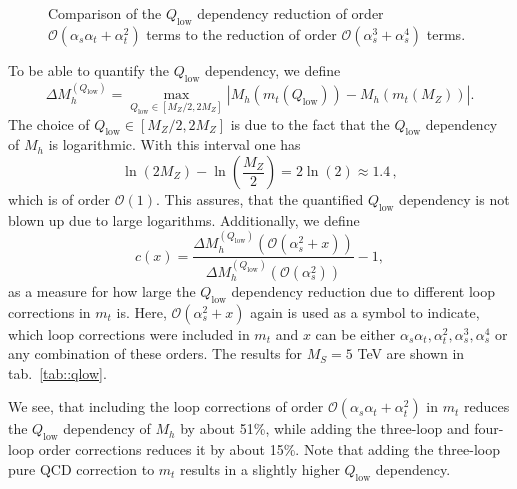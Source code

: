 \documentclass[a4paper,12pt]{book}
\begin{document}
\begin{figure}[h]
\begin{minipage}[t]{0.5\textwidth}
\captionsetup{width=.8\textwidth}
\caption{Comparison of the $Q_\text{low}$ dependency reduction of order $\mathcal{O}(\alpha_s\alpha_t+\alpha_t^2)$ terms to the reduction of order $\mathcal{O}(\alpha_s^3+\alpha_s^4)$ terms.}
\label{fig::Mh_Qlow_mt2Lvsmt3L4LQCD}
\end{minipage}
\end{figure}\par 
To be able to quantify the $Q_\text{low}$ dependency, we define 
\begin{equation}
\label{eq::Deltaqlow}
\Delta M_h^{(Q_\text{low})} = \max_{Q_\text{low} \in [M_Z/2,2 M_Z]} |M_h(m_t(Q_\text{low})) - M_h(m_t(M_Z))|.
\end{equation}
The choice of $Q_\text{low} \in [M_Z/2,2 M_Z]$ is due to the fact that the $Q_\text{low}$ dependency of $M_h$ is logarithmic. With this interval one has
\begin{equation}
\ln(2M_Z) - \ln\left(\frac{M_Z}{2}\right) = 2 \ln(2) \approx 1.4\,,
\end{equation}
which is of order $\mathcal{O}(1)$. This assures, that the quantified $Q_\text{low}$ dependency is not blown up due to large logarithms. Additionally, we define 
\begin{equation}
\label{eq::c}
c(x) = \frac{\Delta M_h^{(Q_\text{low})}(\mathcal{O}(\alpha_s^2+x))}{\Delta M_h^{(Q_\text{low})}(\mathcal{O}(\alpha_s^2))}-1,
\end{equation}
\noindent 
as a measure for how large the $Q_\text{low}$ dependency reduction due to different loop corrections in $m_t$ is. Here, $\mathcal{O}(\alpha_s^2+x)$ again is used as a symbol to indicate, which loop corrections were included in $m_t$ and $x$ can be either $\alpha_s\alpha_t,\alpha_t^2,\alpha_s^3,\alpha_s^4$ or any combination of these orders. The results for $M_S=5$ TeV are shown in tab.\ \ref{tab::qlow}.\par
We see, that including the loop corrections of order $\mathcal{O}(\alpha_s\alpha_t+\alpha_t^2)$ in $m_t$ reduces the $Q_\text{low}$ dependency of $M_h$ by about 51\%, while adding the three-loop and four-loop order corrections reduces it by about 15\%. Note that adding the three-loop pure QCD correction to $m_t$ results in a slightly higher $Q_\text{low}$ dependency.\clearpage
\end{document}

